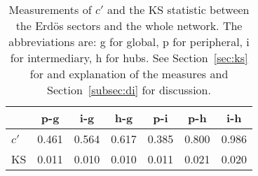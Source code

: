 \begin{table}[h!]
\begin{center}
\begin{tabular}{| l | c | c | c | c | c | c |}\hline
 & p-g & i-g & h-g & p-i & p-h & i-h \\\hline
$c'$ & 0.461  & 0.564  & 0.617  & 0.385  & 0.800  & 0.986 \\\hline
KS & 0.011  & 0.010  & 0.010  & 0.011  & 0.021  & 0.020 \\\hline
\end{tabular}
\caption{Measurements of $c'$ and the KS statistic between the Erd\"os sectors and the whole network. The abbreviations are: g for global, p for peripheral, i for intermediary, h for hubs. See Section~\ref{sec:ks} for and explanation of the measures and Section~\ref{subsec:di} for discussion.}
\end{center}
\end{table}